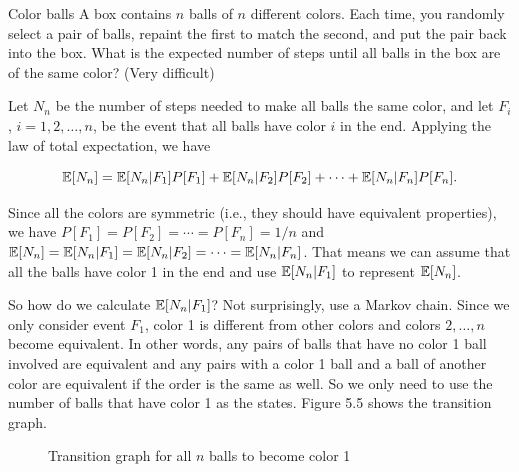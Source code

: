 \begin{problem}{Color balls}
A box contains $n$ balls of $n$ different colors. Each time, you randomly select a pair of balls,
repaint the first to match the second, and put the pair back into the box. What is the expected number
of steps until all balls in the box are of the same color? (Very difficult)
\end{problem}

\begin{solution}
Let $N_n$ be the number of steps needed to make all balls the same color, and let $F_i$, $i=1,2,\ldots,n$,
be the event that all balls have color $i$ in the end. Applying the law of total expectation, we have

\[
\mathbb{E}[N_n]=\mathbb{E}[N_n\vert F_1]P[F_1]+\mathbb{E}[N_n\vert F_2]P[F_2]+\cdots+\mathbb{E}[N_n\vert F_n]P[F_n].
\]

Since all the colors are symmetric (i.e., they should have equivalent properties), we have
$P[F_1]=P[F_2]=\cdots=P[F_n]=1/n$ and
$\mathbb{E}[N_n]=\mathbb{E}[N_n\vert F_1]=\mathbb{E}[N_n\vert F_2]=\cdots=\mathbb{E}[N_n\vert F_n]$. That means we can assume that all
the balls have color 1 in the end and use $\mathbb{E}[N_n\vert F_1]$ to represent $\mathbb{E}[N_n]$.

So how do we calculate $\mathbb{E}[N_n\vert F_1]$? Not surprisingly, use a Markov chain. Since we only consider
event $F_1$, color 1 is different from other colors and colors $2,\ldots,n$ become equivalent. In other
words, any pairs of balls that have no color 1 ball involved are equivalent and any pairs with a color 1
ball and a ball of another color are equivalent if the order is the same as well. So we only need to use
the number of balls that have color 1 as the states. Figure 5.5 shows the transition graph.

\begin{figure}[ht]
\centering
{}
\caption{Transition graph for all $n$ balls to become color 1}
\label{fig:zhou-figure-5-5}
\end{figure}


\end{solution}
